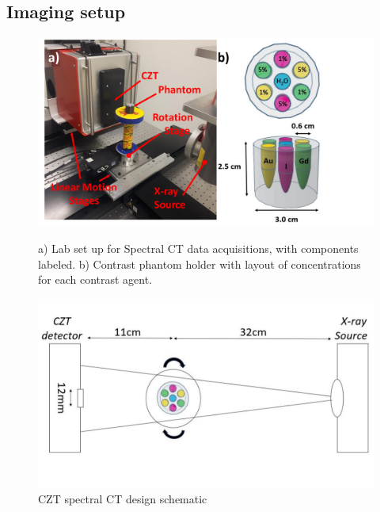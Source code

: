 \documentclass[journal, a4paper]{IEEEtran}
\begin{document}
\subsection{Imaging setup}
\begin{center}
\begin{figure}[htbp]
\includegraphics[width=\linewidth]{PhantomOrientation.pdf}
\caption{a) Lab set up for Spectral CT data acquisitions, with components labeled.  b) Contrast phantom holder with layout of concentrations for each contrast agent. }

\includegraphics[width=\linewidth]{LabSchematic.pdf}
\caption{CZT spectral CT design schematic}
\label{imagingsetup}
\end{figure}
\end{center}
\end{document}
